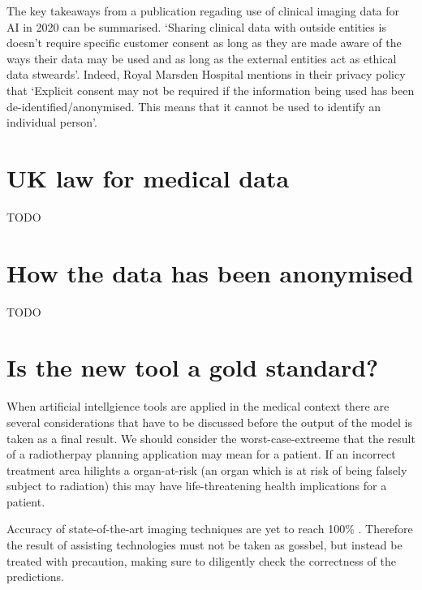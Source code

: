 \documentclass[11pt]{article}
\begin{document}
The key takeaways from a publication regading use of clinical imaging data for AI in 2020 \cite{ethics-imaging-AI} can be summarised. `Sharing clinical data with outside entities is doesn't require specific customer consent as long as they are made aware of the ways their data may be used and as long as the external entities act as ethical data stweards'. Indeed, Royal Marsden Hospital mentions in their privacy policy that `Explicit consent may not be required if the information being used has been de-identified/anonymised. This means that it cannot be used to identify an individual person'\cite{royal-marsden-privacy-note}.

\section{UK law for medical data}

TODO

\section{How the data has been anonymised}

TODO

\section{Is the new tool a gold standard?}

When artificial intellgience tools are applied in the medical context there are several considerations that have to be discussed before the output of the model is taken as a final result. We should consider the worst-case-extreeme that the result of a radiotherpay planning application may mean for a patient. If an incorrect treatment area hilights a organ-at-risk (an organ which is at risk of being falsely subject to radiation) this may have life-threatening health implications for a patient. 

Accuracy of state-of-the-art imaging techniques are yet to reach 100\% \cite{}. Therefore the result of assisting technologies must not be taken as gossbel, but instead be treated with precaution, making sure to diligently check the correctness of the predictions.

\printbibliography
\end{document}
